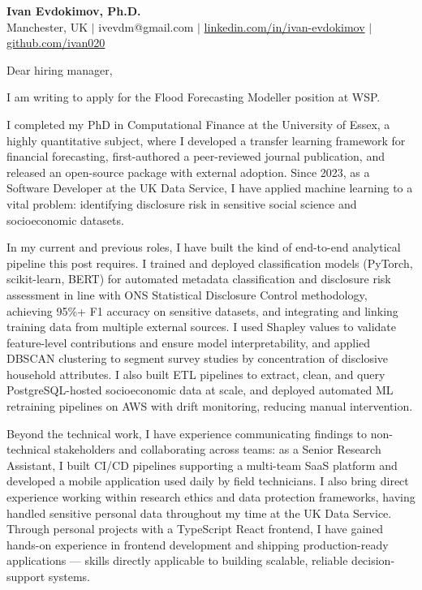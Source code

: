 \documentclass[11pt]{letter}
\begin{document}
\begin{center}
{\Large \textbf{Ivan Evdokimov, Ph.D.}}\\[4pt]
{\small Manchester, UK \; $|$ \; ivevdm@gmail.com \; $|$ \; \href{https://linkedin.com/in/ivan-evdokimov}{linkedin.com/in/ivan-evdokimov} \; $|$ \; \href{https://github.com/ivan020}{github.com/ivan020}}
\end{center}

\vspace{10pt}


Dear hiring manager,

I am writing to apply for the Flood Forecasting Modeller position at WSP.

I completed my PhD in Computational Finance at the University of Essex, a highly quantitative subject, where I developed a transfer learning framework for financial forecasting, first-authored a peer-reviewed journal publication, and released an open-source package with external adoption. Since 2023, as a Software Developer at the UK Data Service, I have applied machine learning to a vital problem: identifying disclosure risk in sensitive social science and socioeconomic datasets.

In my current and previous roles, I have built the kind of end-to-end analytical pipeline this post requires. I trained and deployed classification models (PyTorch, scikit-learn, BERT) for automated metadata classification and disclosure risk assessment in line with ONS Statistical Disclosure Control methodology, achieving 95\%+ F1 accuracy on sensitive datasets, and integrating and linking training data from multiple external sources. I used Shapley values to validate feature-level contributions and ensure model interpretability, and applied DBSCAN clustering to segment survey studies by concentration of disclosive household attributes. I also built ETL pipelines to extract, clean, and query PostgreSQL-hosted socioeconomic data at scale, and deployed automated ML retraining pipelines on AWS with drift monitoring, reducing manual intervention.

Beyond the technical work, I have experience communicating findings to non-technical stakeholders and collaborating across teams: as a Senior Research Assistant, I built CI/CD pipelines supporting a multi-team SaaS platform and developed a mobile application used daily by field technicians. 
I also bring direct experience working within research ethics and data protection frameworks, having handled sensitive personal data throughout my time at the UK Data Service.
Through personal projects with a TypeScript React frontend, I have gained hands-on experience in frontend development and shipping production-ready applications --- skills directly applicable to building scalable, reliable decision-support systems.
\end{document}
